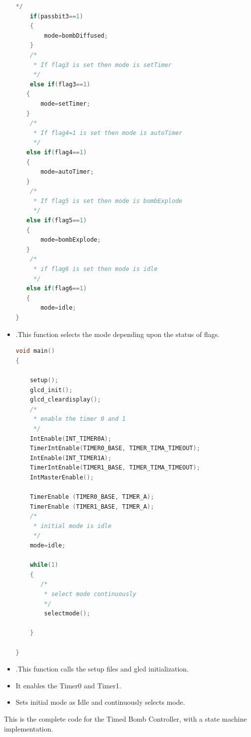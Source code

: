\documentclass{article}
\begin{document}
\begin{itemize}
\begin{lstlisting}[basicstyle = \small, language = C]
 */
    if(passbit3==1)
    {
        mode=bombDiffused;
    }
    /*
     * If flag3 is set then mode is setTimer
     */
    else if(flag3==1)
   {
       mode=setTimer;
   }
    /*
     * If flag4=1 is set then mode is autoTimer
     */
   else if(flag4==1)
   {
       mode=autoTimer;
   }
    /*
     * If flag5 is set then mode is bombExplode
     */
   else if(flag5==1)
   {
       mode=bombExplode;
   }
    /*
     * if flag6 is set then mode is idle
     */
   else if(flag6==1)
   {
       mode=idle;
}
  \end{lstlisting}
  \item {}.This function selects the mode depending upon the status of flags.
      \begin{lstlisting}[basicstyle = \small, language = C]
void main()
{

    setup();
    glcd_init();
    glcd_cleardisplay();
    /*
     * enable the timer 0 and 1
     */
    IntEnable(INT_TIMER0A);
    TimerIntEnable(TIMER0_BASE, TIMER_TIMA_TIMEOUT);
    IntEnable(INT_TIMER1A);
    TimerIntEnable(TIMER1_BASE, TIMER_TIMA_TIMEOUT);
    IntMasterEnable();

    TimerEnable (TIMER0_BASE, TIMER_A);
    TimerEnable (TIMER1_BASE, TIMER_A);
    /*
     * initial mode is idle
     */
    mode=idle;

    while(1)
    {
       /*
        * select mode continuously
        */
        selectmode();

    }

}
  \end{lstlisting}
  \item {}.This function calls the setup files and glcd initialization.
   \item It enables the Timer0 and Timer1.
   \item Sets initial mode as Idle and continuously selects mode.
  \end{itemize}
This is the complete code for the Timed Bomb Controller, with a state machine implementation.
\end{document}
